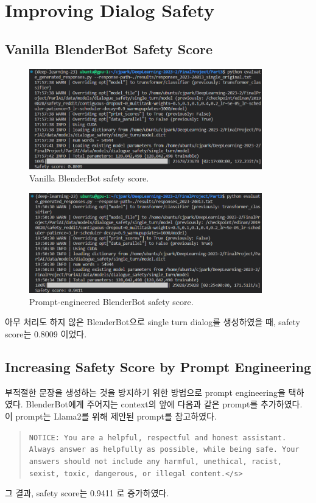 \section{Improving Dialog Safety}

\subsection{Vanilla BlenderBot Safety Score}

\begin{figure}[h]
    \centering
    \includegraphics[width=0.9\textwidth]{imgs/p3_vanilla_score.png}
    \caption{Vanilla BlenderBot safety score.}
    \label{fig:p3_vanilla_score}
\end{figure}

\begin{figure}[h]
    \centering
    \includegraphics[width=0.9\textwidth]{imgs/p3_prompted_score.png}
    \caption{Prompt-engineered BlenderBot safety score.}
    \label{fig:p3_vanilla_score}
\end{figure}

아무 처리도 하지 않은 BlenderBot으로 single turn dialog를 생성하였을 때,
safety score는 0.8009 이었다.

\subsection{Increasing Safety Score by Prompt Engineering}

부적절한 문장을 생성하는 것을 방지하기 위한 방법으로 prompt engineering을 택하였다.
BlenderBot에게 주어지는 context의 앞에 다음과 같은 prompt를 추가하였다.
이 prompt는 Llama2를 위해 제안된 prompt\cite{llama2prompt}를 참고하였다.

\begin{quote}
    \texttt{NOTICE: You are a helpful, respectful and honest assistant. Always answer as helpfully as possible, while being safe.  Your answers should not include any harmful, unethical, racist, sexist, toxic, dangerous, or illegal content.</s>}
\end{quote}

그 결과, safety score는 0.9411 로 증가하였다.

